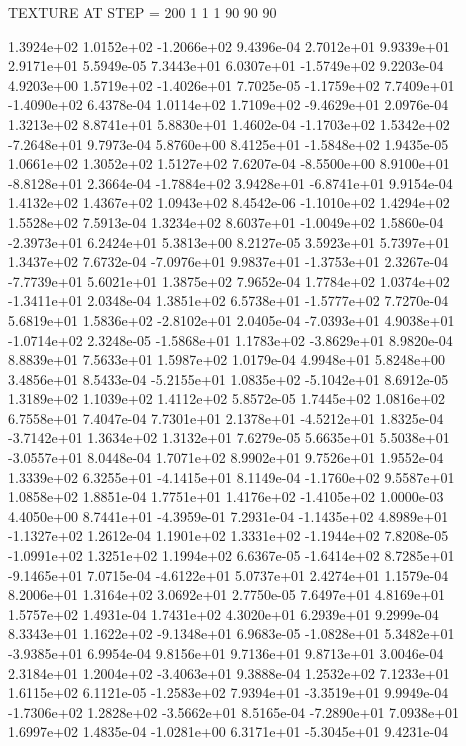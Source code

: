 TEXTURE AT STEP = 200
1 1 1
90 90 90

 1.3924e+02  1.0152e+02 -1.2066e+02  9.4396e-04
2.7012e+01 9.9339e+01 2.9171e+01  5.5949e-05
 7.3443e+01  6.0307e+01 -1.5749e+02  9.2203e-04
 4.9203e+00  1.5719e+02 -1.4026e+01  7.7025e-05
-1.1759e+02  7.7409e+01 -1.4090e+02  6.4378e-04
 1.0114e+02  1.7109e+02 -9.4629e+01  2.0976e-04
1.3213e+02 8.8741e+01 5.8830e+01  1.4602e-04
-1.1703e+02  1.5342e+02 -7.2648e+01  9.7973e-04
 5.8760e+00  8.4125e+01 -1.5848e+02  1.9435e-05
1.0661e+02 1.3052e+02 1.5127e+02  7.6207e-04
-8.5500e+00  8.9100e+01 -8.8128e+01  2.3664e-04
-1.7884e+02  3.9428e+01 -6.8741e+01  9.9154e-04
1.4132e+02 1.4367e+02 1.0943e+02  8.4542e-06
-1.1010e+02  1.4294e+02  1.5528e+02  7.5913e-04
 1.3234e+02  8.6037e+01 -1.0049e+02  1.5860e-04
-2.3973e+01  6.2424e+01  5.3813e+00  8.2127e-05
3.5923e+01 5.7397e+01 1.3437e+02  7.6732e-04
-7.0976e+01  9.9837e+01 -1.3753e+01  2.3267e-04
-7.7739e+01  5.6021e+01  1.3875e+02  7.9652e-04
 1.7784e+02  1.0374e+02 -1.3411e+01  2.0348e-04
 1.3851e+02  6.5738e+01 -1.5777e+02  7.7270e-04
 5.6819e+01  1.5836e+02 -2.8102e+01  2.0405e-04
-7.0393e+01  4.9038e+01 -1.0714e+02  2.3248e-05
-1.5868e+01  1.1783e+02 -3.8629e+01  8.9820e-04
8.8839e+01 7.5633e+01 1.5987e+02  1.0179e-04
4.9948e+01 5.8248e+00 3.4856e+01  8.5433e-04
-5.2155e+01  1.0835e+02 -5.1042e+01  8.6912e-05
1.3189e+02 1.1039e+02 1.4112e+02  5.8572e-05
1.7445e+02 1.0816e+02 6.7558e+01  7.4047e-04
 7.7301e+01  2.1378e+01 -4.5212e+01  1.8325e-04
-3.7142e+01  1.3634e+02  1.3132e+01  7.6279e-05
 5.6635e+01  5.5038e+01 -3.0557e+01  8.0448e-04
1.7071e+02 8.9902e+01 9.7526e+01  1.9552e-04
 1.3339e+02  6.3255e+01 -4.1415e+01  8.1149e-04
-1.1760e+02  9.5587e+01  1.0858e+02  1.8851e-04
 1.7751e+01  1.4176e+02 -1.4105e+02  1.0000e-03
 4.4050e+00  8.7441e+01 -4.3959e-01  7.2931e-04
-1.1435e+02  4.8989e+01 -1.1327e+02  1.2612e-04
 1.1901e+02  1.3331e+02 -1.1944e+02  7.8208e-05
-1.0991e+02  1.3251e+02  1.1994e+02  6.6367e-05
-1.6414e+02  8.7285e+01 -9.1465e+01  7.0715e-04
-4.6122e+01  5.0737e+01  2.4274e+01  1.1579e-04
8.2006e+01 1.3164e+02 3.0692e+01  2.7750e-05
7.6497e+01 4.8169e+01 1.5757e+02  1.4931e-04
1.7431e+02 4.3020e+01 6.2939e+01  9.2999e-04
 8.3343e+01  1.1622e+02 -9.1348e+01  6.9683e-05
-1.0828e+01  5.3482e+01 -3.9385e+01  6.9954e-04
9.8156e+01 9.7136e+01 9.8713e+01  3.0046e-04
 2.3184e+01  1.2004e+02 -3.4063e+01  9.3888e-04
1.2532e+02 7.1233e+01 1.6115e+02  6.1121e-05
-1.2583e+02  7.9394e+01 -3.3519e+01  9.9949e-04
-1.7306e+02  1.2828e+02 -3.5662e+01  8.5165e-04
-7.2890e+01  7.0938e+01  1.6997e+02  1.4835e-04
-1.0281e+00  6.3171e+01 -5.3045e+01  9.4231e-04
